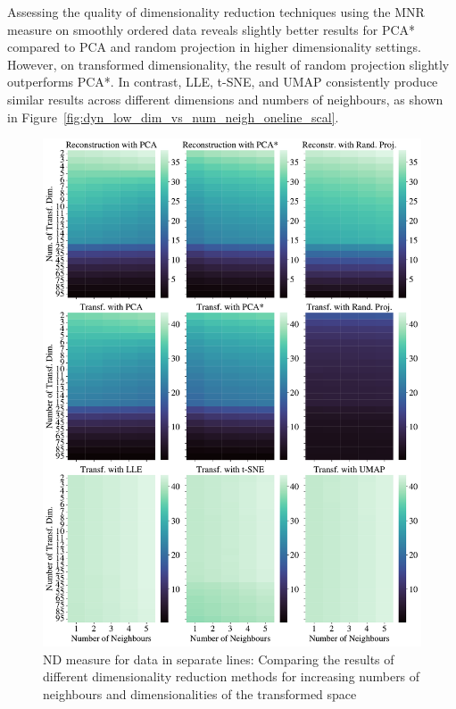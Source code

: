 \documentclass[pdftex,12pt,a4paper]{report}
\begin{document}
Assessing the quality of dimensionality reduction techniques using the MNR measure on smoothly ordered data reveals slightly better results for PCA* compared to PCA and random projection in higher dimensionality settings.
However, on transformed dimensionality, the result of random projection slightly outperforms PCA*.
In contrast, LLE, t-SNE, and UMAP consistently produce similar results across different dimensions and numbers of neighbours, as shown in Figure~\ref{fig:dyn_low_dim_vs_num_neigh_oneline_scal}.

\begin{figure}[htb!]
    \includegraphics*[width= \textwidth]{images/multiple_runs/sep_lines/dyn_low_dim_vs_num_neigh/euclidean/all_methods_10runs_5lines_100points_5neighbours.pdf}
    \caption{ND measure for data in separate lines: Comparing the results of different dimensionality reduction methods for increasing numbers of neighbours and dimensionalities of the transformed space} \label{fig:dyn_low_dim_vs_num_neigh_seplines}
\end{figure}
\end{document}
